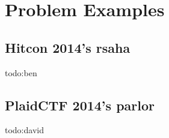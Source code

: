 \section{Problem Examples}
\subsection{Hitcon 2014's rsaha}
todo:ben
\subsection{PlaidCTF 2014's parlor}
todo:david
